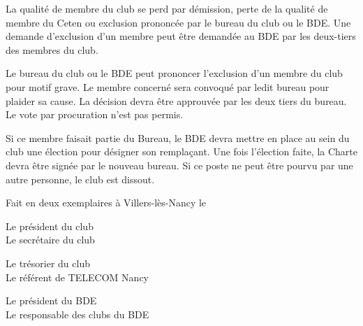 \documentclass{article} %
\begin{document}
\begin{multicols}{2}
		{\small

			La qualité de membre du club se perd par démission, perte
			de la qualité de membre du Ceten ou exclusion prononcée
			par le bureau du club ou le BDE\@. Une demande d’exclusion
			d’un membre peut être demandée au BDE par les deux-tiers
			des membres du club.

			Le bureau du club ou le BDE peut prononcer l’exclusion d’un
			membre du club pour motif grave. Le membre concerné
			sera convoqué par ledit bureau pour plaider sa cause. La
			décision devra être approuvée par les deux tiers du bureau.
			Le vote par procuration n’est pas permis.

			Si ce membre faisait partie du Bureau, le BDE devra mettre
			en place au sein du club une élection pour désigner son
			remplaçant. Une fois l’élection faite, la Charte devra être
			signée par le nouveau bureau. Si ce poste ne peut être
			pourvu par une autre personne, le club est dissout.

		}
		
	\end{multicols}

	\vfill
	Fait en deux exemplaires à Villers-lès-Nancy le \underline{\hspace{5cm}}
	\vfill

	\begin{multicols}{2}
		Le président du club \\
		Le secrétaire du club 
	\end{multicols}
		\vspace*{4cm}
	\begin{multicols}{2}
		Le trésorier du club \\
		Le référent de TELECOM Nancy 
	\end{multicols}
		\vspace*{4cm}
	\begin{multicols}{2}
		Le président du BDE \\
		Le responsable des clubs du BDE 
	\end{multicols}
		\vspace*{4cm}
\end{document}
